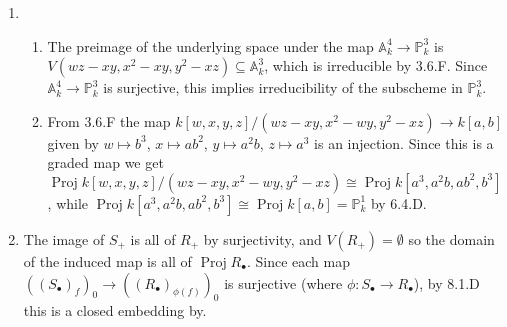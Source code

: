 \documentclass{report}
\newcommand{\A}{\mathbb{A}}
\renewcommand{\P}{\mathbb{P}} %
\DeclareMathOperator{\Proj}{Proj}
\begin{document}
\begin{enumerate}[label=\textbf{8.2.\Alph*.}]
	\item
	      \begin{enumerate}[label=(\alph*)]
		      \item The preimage of the underlying space under the map
		            $\A^4_k\to\P^3_k$ is $V(wz-xy,x^2-xy,y^2-xz)\subseteq\A^3_k$,
		            which is irreducible by 3.6.F. Since $\A^4_k\to\P^3_k$ is
		            surjective, this implies irreducibility of the subscheme in
		            $\P^3_k$.

		      \item From 3.6.F the map
		            $k[w,x,y,z]/(wz-xy,x^2-wy,y^2-xz)\to k[a,b]$ given by
		            $w\mapsto b^3$, $x\mapsto ab^2$, $y\mapsto a^2b$, $z\mapsto a^3$
		            is an injection. Since this is a graded map we get
		            $\Proj k[w,x,y,z]/(wz-xy,x^2-wy,y^2-xz)\cong\Proj k[a^3,a^2b,ab^2,b^3]$,
		            while $\Proj k[a^3,a^2b,ab^2,b^3]\cong\Proj k[a,b]=\P^1_k$
		            by 6.4.D.
	      \end{enumerate}

	\item The image of $S_+$ is all of $R_+$ by surjectivity, and
	      $V(R_+)=\emptyset$ so the domain of the induced map is all of
	      $\Proj R_\bullet$. Since each map
	      $((S_\bullet)_f)_0\to((R_\bullet)_{\phi(f)})_0$ is surjective (where
	      $\phi:S_\bullet\to R_\bullet$), by 8.1.D this is a closed embedding by.


\end{enumerate}
\end{document}
